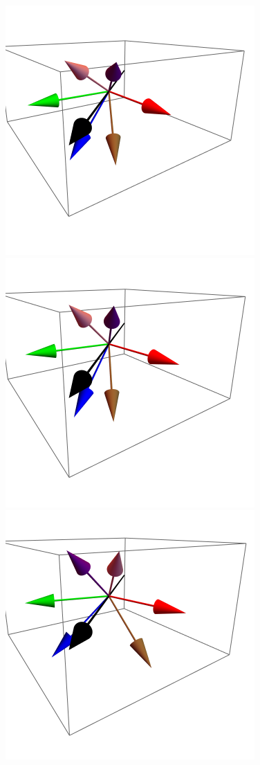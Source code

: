 \documentclass{article}
\begin{document}
\begin{figure}[ht]
\centering
\includegraphics[scale=0.3]{HVariedData/Pictures/110Dec1.png}
\includegraphics[scale=0.3]{HVariedData/Pictures/110Dec102.png}
\includegraphics[scale=0.3]{HVariedData/Pictures/110Dec122.png}

\end{figure}
\end{document}
